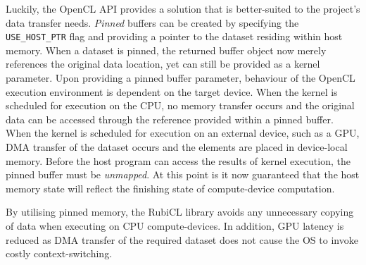 Luckily, the \ac{OpenCL} \ac{API} provides a solution that is better-suited to the project's data transfer needs.
\emph{Pinned} buffers can be created by specifying the \verb|USE_HOST_PTR| flag and providing a pointer to the dataset residing within host memory.
When a dataset is pinned, the returned buffer object now merely references the original data location, yet can still be provided as a kernel parameter.
Upon providing a pinned buffer parameter, behaviour of the \ac{OpenCL} execution environment is dependent on the target device.
When the kernel is scheduled for execution on the \ac{CPU}, no memory transfer occurs and the original data can be accessed through the reference provided within a pinned buffer.
When the kernel is scheduled for execution on an external device, such as a \ac{GPU}, \ac{DMA} transfer of the dataset occurs and the elements are placed in device-local memory.
Before the host program can access the results of kernel execution, the pinned buffer must be \emph{unmapped}. At this point is it now guaranteed that the host memory state will reflect the finishing state of compute-device computation.

By utilising pinned memory, the RubiCL library avoids any unnecessary copying of data when executing on \ac{CPU} compute-devices. In addition, \ac{GPU} latency is reduced as \ac{DMA} transfer of the required dataset does not cause the \ac{OS} to invoke costly context-switching.

